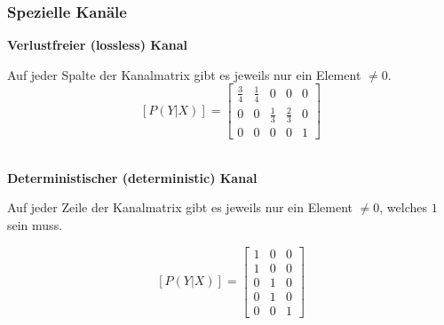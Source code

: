 \subsubsection{Spezielle Kanäle }
\textbf{Verlustfreier (lossless) Kanal} \\
\begin{minipage}{14cm}
	Auf jeder Spalte der Kanalmatrix gibt es jeweils nur ein  Element $\neq 0$. \\

	$$ [P(Y | X)] = \begin{bmatrix}
              \frac34 & \frac14 & 0 & 0 & 0 \\
              0 & 0 & \frac13 & \frac23 & 0 \\
              0 & 0 & 0 & 0 & 1
           \end{bmatrix}$$ \\
\end{minipage}
\begin{minipage}{5cm}
\begin{center}
\end{center}
\end{minipage}

\textbf{Deterministischer (deterministic) Kanal} \\
\begin{minipage}{14cm}
	Auf jeder Zeile der Kanalmatrix gibt es jeweils nur ein  Element $\neq 0$, welches $1$ sein
	muss.

	$$ [P(Y | X)] = \begin{bmatrix}
           		1 & 0 & 0 \\
           		1 & 0 & 0 \\
           		0 & 1 & 0 \\
           		0 & 1 & 0 \\
           		0 & 0 & 1
           \end{bmatrix}$$
\end{minipage}
\begin{minipage}{5cm}
\begin{center}
\end{center}
\end{minipage}

